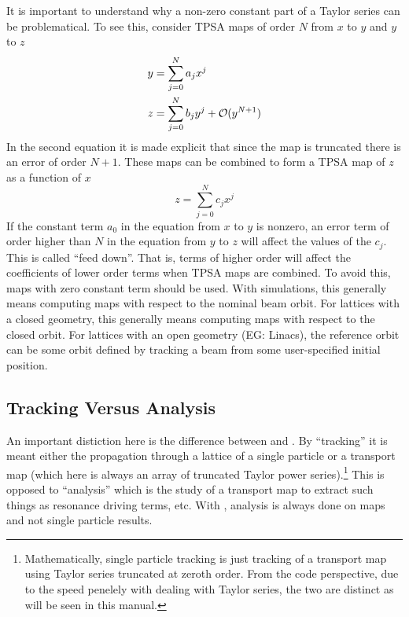 \documentclass{hitec}     %
\begin{document}
It is important to understand why a non-zero constant part of a Taylor series can be
problematical. To see this, consider TPSA maps of order $N$ from $x$ to $y$ and $y$ to $z$
\begin{align}
  y &= \sum_{j = 0}^N a_j x^j \\
  z &= \sum_{j = 0}^N b_j y^j + {\cal O}(y^{N+1}) \nonumber
\end{align}
In the second equation it is made explicit that since the map is truncated there is an error of
order $N+1$. These maps can be combined to form a TPSA map of $z$ as a function of $x$ 
\begin{equation}
  z = \sum_{j = 0}^N c_j x^j
\end{equation}
If the constant term $a_0$ in the equation from $x$ to $y$ is nonzero, an error term of order higher
than $N$ in the equation from $y$ to $z$ will affect the values of the $c_j$. This is called ``feed
down''. That is, terms of higher order will affect the coefficients of lower order terms when TPSA
maps are combined. To avoid this, maps with zero constant term should be used. With simulations,
this generally means computing maps with respect to the nominal beam orbit. For lattices with a
closed geometry, this generally means computing maps with respect to the closed orbit. For lattices
with an open geometry (EG: Linacs), the reference orbit can be some orbit defined by tracking a beam
from some user-specified initial position.

\subsection{Tracking Versus Analysis}
\label{s:tracking.analysis}

An important distiction here is the difference between  and . By
``tracking'' it is meant either the propagation through a lattice of a single particle or a
transport map (which here is always an array of truncated Taylor power series).\footnote
  {
Mathematically, single particle tracking is just tracking of a transport map using Taylor series
truncated at zeroth order. From the code perspective, due to the speed penelely with dealing with
Taylor series, the two are distinct as will be seen in this manual.
  }
This is opposed to ``analysis'' which is the study of a transport map to extract such things as
resonance driving terms, etc. With , analysis is always done on maps and not single particle
results. 
\end{document}
